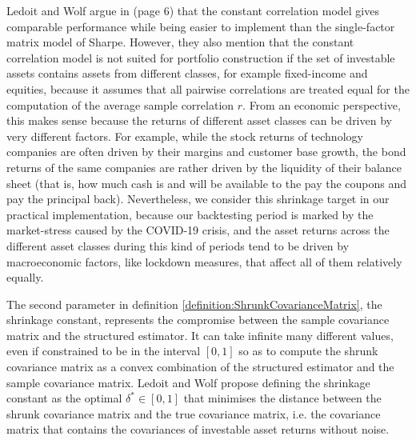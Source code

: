     	Ledoit and Wolf argue in \cite{ledoit} (page 6) that the constant correlation model gives comparable performance while being easier to implement than the single-factor matrix model of Sharpe. However, they also mention that the constant correlation model is not suited for portfolio construction if the set of investable assets contains assets from different classes, for example fixed-income and equities, because it assumes that all pairwise correlations are treated equal for the computation of the average sample correlation $r$. From an economic perspective, this makes sense because the returns of different asset classes can be driven by very different factors. For example, while the stock returns of technology companies are often driven by their margins and customer base growth, the bond returns of the same companies are rather driven by the liquidity of their balance sheet (that is, how much cash is and will be available to the pay the coupons and pay the principal back). Nevertheless, we consider this shrinkage target in our practical implementation, because our backtesting period is marked by the market-stress caused by the COVID-19 crisis, and the asset returns across the different asset classes during this kind of periods tend to be driven by macroeconomic factors, like lockdown measures, that affect all of them relatively equally.
    	
    	The second parameter in definition \ref{definition:ShrunkCovarianceMatrix}, the shrinkage constant, represents the compromise between the sample covariance matrix and the structured estimator. It can take infinite many different values, even if constrained to be in the interval $[0,1]$ so as to compute the shrunk covariance matrix as a convex combination of the structured estimator and the sample covariance matrix. Ledoit and Wolf propose defining the shrinkage constant as the optimal $\delta^* \in [0,1]$ that minimises the distance between the shrunk covariance matrix and the true covariance matrix, i.e. the covariance matrix that contains the covariances of investable asset returns without noise.
    	
